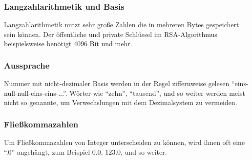 \subsubsection{Langzahlarithmetik und Basis}
Langzahlarithmetik nutzt sehr große Zahlen die in mehreren Bytes gespeichert sein können. Der öffentliche und private
Schlüssel im RSA-Algorithmus beispielsweise benötigt 4096 Bit und mehr.
\DEph{}

\subsubsection{Aussprache}
Nummer mit nicht-dezimaler Basis werden in der Regel ziffernweise gelesen ``eins-null-null-eins-eins-...''.
Wörter wie ``zehn'', ``tausend'', und so weiter werden meist nicht so genannte, um Verwechslungen mit dem
Dezimalsystem zu vermeiden.

\subsubsection{Fließkommazahlen}
Um Fließkommazahlen von Integer unterscheiden zu können, wird ihnen oft eine ``.0'' angehängt,
zum Beispiel 0.0, 123.0, und so weiter.

